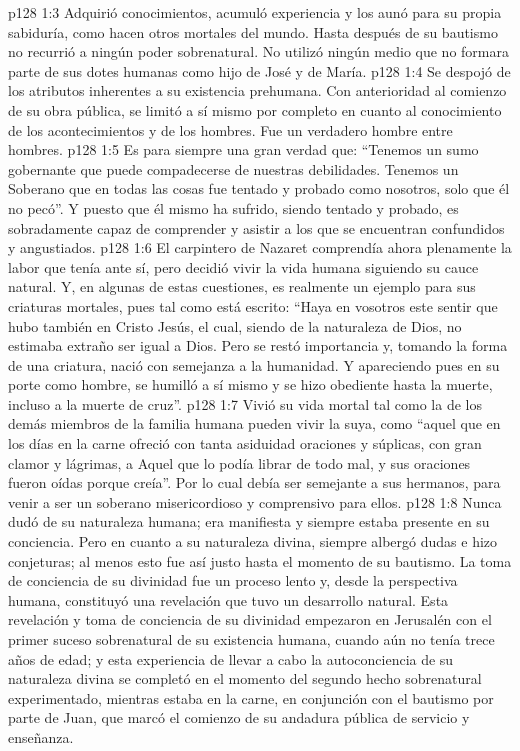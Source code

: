 \vs p128 1:3 Adquirió conocimientos, acumuló experiencia y los aunó para su propia sabiduría, como hacen otros mortales del mundo. Hasta después de su bautismo no recurrió a ningún poder sobrenatural. No utilizó ningún medio que no formara parte de sus dotes humanas como hijo de José y de María.
\vs p128 1:4 Se despojó de los atributos inherentes a su existencia prehumana. Con anterioridad al comienzo de su obra pública, se limitó a sí mismo por completo en cuanto al conocimiento de los acontecimientos y de los hombres. Fue un verdadero hombre entre hombres.
\vs p128 1:5 \pc Es para siempre una gran verdad que: “Tenemos un sumo gobernante que puede compadecerse de nuestras debilidades. Tenemos un Soberano que en todas las cosas fue tentado y probado como nosotros, solo que él no pecó”. Y puesto que él mismo ha sufrido, siendo tentado y probado, es sobradamente capaz de comprender y asistir a los que se encuentran confundidos y angustiados.
\vs p128 1:6 \pc El carpintero de Nazaret comprendía ahora plenamente la labor que tenía ante sí, pero decidió vivir la vida humana siguiendo su cauce natural. Y, en algunas de estas cuestiones, es realmente un ejemplo para sus criaturas mortales, pues tal como está escrito: “Haya en vosotros este sentir que hubo también en Cristo Jesús, el cual, siendo de la naturaleza de Dios, no estimaba extraño ser igual a Dios. Pero se restó importancia y, tomando la forma de una criatura, nació con semejanza a la humanidad. Y apareciendo pues en su porte como hombre, se humilló a sí mismo y se hizo obediente hasta la muerte, incluso a la muerte de cruz”.
\vs p128 1:7 Vivió su vida mortal tal como la de los demás miembros de la familia humana pueden vivir la suya, como “aquel que en los días en la carne ofreció con tanta asiduidad oraciones y súplicas, con gran clamor y lágrimas, a Aquel que lo podía librar de todo mal, y sus oraciones fueron oídas porque creía”. Por lo cual debía ser  semejante a sus hermanos, para venir a ser un soberano misericordioso y comprensivo para ellos.
\vs p128 1:8 Nunca dudó de su naturaleza humana; era manifiesta y siempre estaba presente en su conciencia. Pero en cuanto a su naturaleza divina, siempre albergó dudas e hizo conjeturas; al menos esto fue así justo hasta el momento de su bautismo. La toma de conciencia de su divinidad fue un proceso lento y, desde la perspectiva humana, constituyó una revelación que tuvo un desarrollo natural. Esta revelación y toma de conciencia de su divinidad empezaron en Jerusalén con el primer suceso sobrenatural de su existencia humana, cuando aún no tenía trece años de edad; y esta experiencia de llevar a cabo la autoconciencia de su naturaleza divina se completó en el momento del segundo hecho sobrenatural experimentado, mientras estaba en la carne, en conjunción con el bautismo por parte de Juan, que marcó el comienzo de su andadura pública de servicio y enseñanza.

